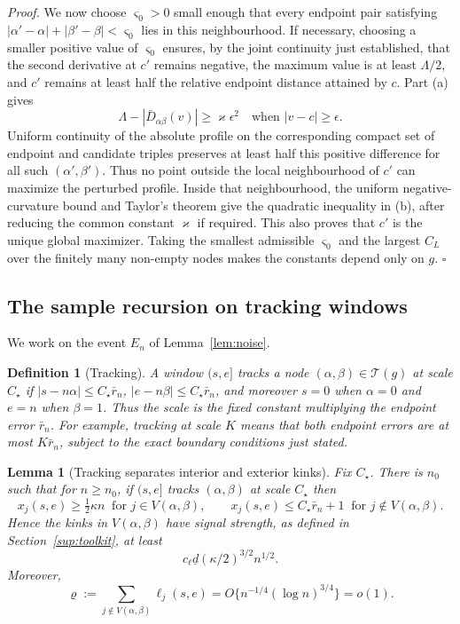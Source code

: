 \documentclass[12pt, a4paper]{article}
\newcommand{\qed}{\hfill$\square$}
\newenvironment{proof}[1][Proof]{\par\noindent\textit{#1.}\space}{\qed\par\medskip}
\newtheorem{lemma}{Lemma}[section]
\newtheorem{defin}{Definition}[section]
\begin{document}
\begin{proof}
We now choose $\varsigma_0>0$ small enough that every endpoint pair satisfying
$|\alpha'-\alpha|+|\beta'-\beta|<\varsigma_0$ lies in this neighbourhood. If
necessary, choosing a smaller positive value of $\varsigma_0$ ensures, by the
joint continuity just established, that the second derivative at $c'$ remains
negative, the maximum value is at least $\Lambda/2$, and $c'$ remains at least
half the relative endpoint distance attained by $c$. Part (a) gives
\[
\Lambda-|\bar D_{\alpha\beta}(v)|\ge\varkappa\epsilon^2
\quad\text{when }|v-c|\ge\epsilon.
\]
Uniform continuity of the absolute profile on the corresponding compact set
of endpoint and candidate triples preserves at least half this positive
difference for all such $(\alpha',\beta')$. Thus no point outside the local
neighbourhood of $c'$ can maximize the perturbed profile. Inside that
neighbourhood, the uniform negative-curvature bound and Taylor's theorem give
the quadratic inequality in (b), after reducing the common constant
$\varkappa$ if required. This also proves that $c'$ is the unique global
maximizer. Taking the smallest admissible $\varsigma_0$ and the largest
$C_L$ over the finitely many non-empty nodes makes the constants depend only
on $g$.
\end{proof}

\subsection{The sample recursion on tracking windows}
\label{sup:track_sec}

We work on the event $E_n$ of Lemma~\ref{lem:noise}.

\begin{defin}[Tracking]
\label{def:track}
A window $(s,e]$ \emph{tracks} a node $(\alpha,\beta) \in \mathcal{T}(g)$ at
scale $C_\star$ if $|s - n\alpha| \le C_\star \bar r_n$,
$|e - n\beta| \le C_\star\bar r_n$, and moreover $s = 0$ when $\alpha = 0$ and
$e = n$ when $\beta = 1$.
Thus the scale is the fixed constant multiplying the endpoint error
$\bar r_n$. For example, tracking at scale $K$ means that both endpoint
errors are at most $K\bar r_n$, subject to the exact boundary conditions just
stated.
\end{defin}

\begin{lemma}[Tracking separates interior and exterior kinks]
\label{lem:track}
Fix $C_\star$. There is $n_0$ such that for $n \ge n_0$, if $(s,e]$ tracks
$(\alpha,\beta)$ at scale $C_\star$ then
\[
x_j(s,e) \ge \tfrac12\kappa n \ \text{ for } j \in V(\alpha,\beta),
\qquad
x_j(s,e) \le C_\star\bar r_n + 1 \ \text{ for } j \notin V(\alpha,\beta).
\]
Hence the kinks in $V(\alpha,\beta)$ have signal strength, as defined in
Section~\ref{sup:toolkit}, at least
\[
c_\ell\underline d(\kappa/2)^{3/2}n^{1/2}.
\]
Moreover,
\[
\varrho:=\sum_{j\notin V(\alpha,\beta)}\ell_j(s,e)
=O\{n^{-1/4}(\log n)^{3/4}\}=o(1).
\]
\end{lemma}
\end{document}
